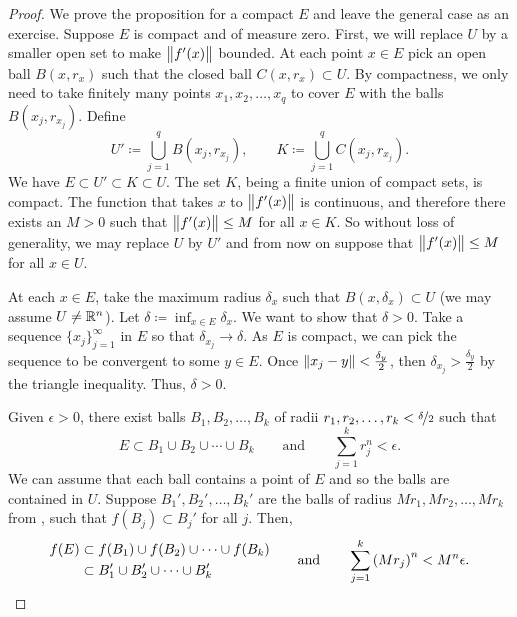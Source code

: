\begin{proof}
We prove the proposition for a compact $E$ and leave the general case as
an exercise.
Suppose $E$ is compact and of measure zero.
First, we will replace $U$ by a smaller open set to make $\bigl\lVert {f'(x)} \bigr\rVert$ bounded.
At each point $x \in
E$ pick an open ball $B(x,r_x)$ such that the closed ball $C(x,r_x) \subset
U$.  By compactness, we only need to take finitely
many points $x_1,x_2,\ldots,x_q$ to cover $E$ with the balls $B(x_j,r_{x_j})$.  Define
\begin{equation*}
U' \coloneqq \bigcup_{j=1}^q B(x_j,r_{x_j}), \qquad
K \coloneqq \bigcup_{j=1}^q C(x_j,r_{x_j}).
\end{equation*}
We have $E \subset U' \subset K \subset U$.  The set $K$, being a finite
union of compact sets, is compact.
The function that takes $x$ to $\bigl\lVert {f'(x)} \bigr\rVert$ is continuous, and therefore
there exists an $M > 0$ such that $\bigl\lVert {f'(x)} \bigr\rVert \leq M$ for all $x \in K$.
So without loss of generality, we may replace $U$ by $U'$ and from now on
suppose that $\bigl\lVert {f'(x)} \bigr\rVert \leq M$ for all $x \in U$.

At each $x \in E$, take the maximum radius $\delta_x$
such that $B(x,\delta_x) \subset U$ (we may assume $U \neq {\mathbb{R}}^n$).
Let $\delta \coloneqq \inf_{x\in E} \delta_x$.
We want to show that $\delta > 0$.
Take a sequence $\{ x_j \}_{j=1}^\infty$ in $E$ so that $\delta_{x_j} \to \delta$.
As $E$ is compact, we can pick the sequence to be convergent to some $y \in
E$.  Once $\lVert {x_j-y} \rVert < \frac{\delta_y}{2}$, then
$\delta_{x_j} > \frac{\delta_y}{2}$ by the triangle inequality.
Thus, $\delta > 0$.

Given $\epsilon > 0$, there exist balls $B_1,B_2,\ldots,B_k$ of radii
$r_1,r_2,\ldots,r_k < \nicefrac{\delta}{2}$ such that
\begin{equation*}
E \subset B_1 \cup B_2 \cup \cdots \cup B_k
\qquad \text{and} \qquad
\sum_{j=1}^k r_j^n < \epsilon.
\end{equation*}
We can assume that each ball contains a point of $E$ and so
the balls are contained in $U$.
Suppose $B_1', B_2', \ldots, B_k'$ are the balls of radius
$Mr_1, Mr_2, \ldots, Mr_k$ from
, such that $f(B_j) \subset B_j'$ for all $j$.
Then,
\begin{equation*}
\begin{aligned}
f(E)
&
\subset f(B_1) \cup f(B_2) \cup \cdots \cup f(B_k)
\\
&
\subset B_1' \cup B_2' \cup \cdots \cup B_k'
\end{aligned}
\qquad \text{and} \qquad
\sum_{j=1}^k {(Mr_j)}^n
 < M^n \epsilon. \qedhere
\end{equation*}
\end{proof}

